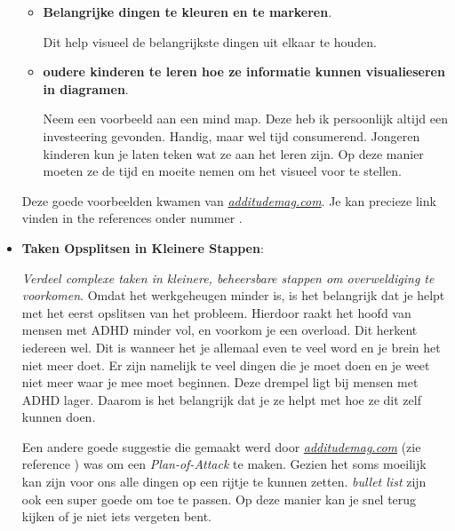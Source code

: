 \documentclass{article}
\begin{document}
\begin{itemize}
\begin{itemize}
                                \item \textbf{Belangrijke dingen te kleuren en te markeren}. 
                                
                                    Dit help visueel de belangrijkste dingen uit elkaar te houden.
                                
                                \item \textbf{oudere kinderen te leren hoe ze informatie kunnen visualieseren in diagramen}. 
                                
                                    Neem een voorbeeld aan een mind map. Deze heb ik persoonlijk altijd een investeering gevonden. Handig, maar wel tijd consumerend. Jongeren kinderen kun je laten teken wat ze aan het leren zijn. Op deze manier moeten ze de tijd en moeite nemen om het visueel voor te stellen. 
                                    
                            \end{itemize}

                            Deze goede voorbeelden kwamen van \emph{\hyperlink{https://www.additudemag.com/visual-learner-homework-help/}{additudemag.com}}. Je kan precieze link vinden in the references onder nummer \cite{ADHD-visual}.

                        \item \textbf{Taken Opsplitsen in Kleinere Stappen}: 
                            
                            \textit{Verdeel complexe taken in kleinere, beheersbare stappen om overweldiging te voorkomen}. Omdat het werkgeheugen minder is, is het belangrijk dat je helpt met het eerst opslitsen van het probleem. Hierdoor raakt het hoofd van mensen met ADHD minder vol, en voorkom je een overload. Dit herkent iedereen wel. Dit is wanneer het je allemaal even te veel word en je brein het niet meer doet. Er zijn namelijk te veel dingen die je moet doen en je weet niet meer waar je mee moet beginnen. Deze drempel ligt bij mensen met ADHD lager. Daarom is het belangrijk dat je ze helpt met hoe ze dit zelf kunnen doen.
                            
                            Een andere goede suggestie die gemaakt werd door \emph{\hyperlink{https://www.additudemag.com/visual-learner-homework-help/}{additudemag.com}} (zie reference \cite{ADHD-visual}) was om een \textit{Plan-of-Attack} te maken. Gezien het soms moeilijk kan zijn voor ons alle dingen op een rijtje te kunnen zetten. \textit{bullet list} zijn ook een super goede om toe te passen. Op deze manier kan je snel terug kijken of je niet iets vergeten bent.


\end{itemize}
\end{document}
